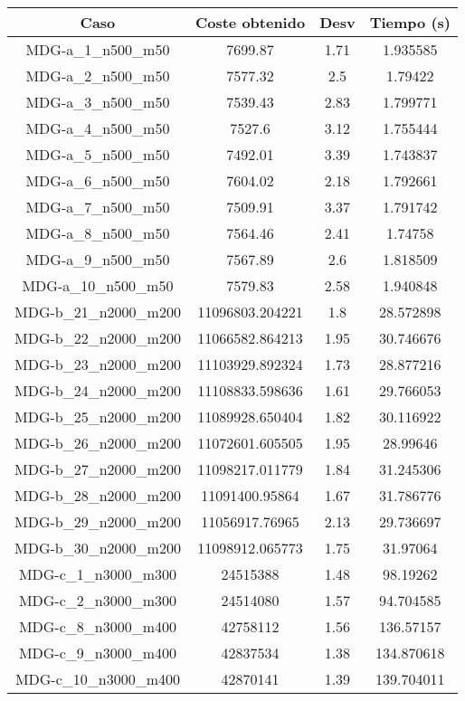 \documentclass{article}
\begin{document}
\begin{table}[H]
	\centering
	\begin{tabular}{|cccc|}
		\hline
		Caso & Coste obtenido & Desv & Tiempo (s)\\ \hline
		MDG-a\_1\_n500\_m50 & 7699.87 & 1.71 & 1.935585\\
		MDG-a\_2\_n500\_m50 & 7577.32 & 2.5 & 1.79422\\
		MDG-a\_3\_n500\_m50 & 7539.43 & 2.83 & 1.799771\\
		MDG-a\_4\_n500\_m50 & 7527.6 & 3.12 & 1.755444\\
		MDG-a\_5\_n500\_m50 & 7492.01 & 3.39 & 1.743837\\
		MDG-a\_6\_n500\_m50 & 7604.02 & 2.18 & 1.792661\\
		MDG-a\_7\_n500\_m50 & 7509.91 & 3.37 & 1.791742\\
		MDG-a\_8\_n500\_m50 & 7564.46 & 2.41 & 1.74758\\
		MDG-a\_9\_n500\_m50 & 7567.89 & 2.6 & 1.818509\\
		MDG-a\_10\_n500\_m50 & 7579.83 & 2.58 & 1.940848\\
		MDG-b\_21\_n2000\_m200 & 11096803.204221 & 1.8 & 28.572898\\
		MDG-b\_22\_n2000\_m200 & 11066582.864213 & 1.95 & 30.746676\\
		MDG-b\_23\_n2000\_m200 & 11103929.892324 & 1.73 & 28.877216\\
		MDG-b\_24\_n2000\_m200 & 11108833.598636 & 1.61 & 29.766053\\
		MDG-b\_25\_n2000\_m200 & 11089928.650404 & 1.82 & 30.116922\\
		MDG-b\_26\_n2000\_m200 & 11072601.605505 & 1.95 & 28.99646\\
		MDG-b\_27\_n2000\_m200 & 11098217.011779 & 1.84 & 31.245306\\
		MDG-b\_28\_n2000\_m200 & 11091400.95864 & 1.67 & 31.786776\\
		MDG-b\_29\_n2000\_m200 & 11056917.76965 & 2.13 & 29.736697\\
		MDG-b\_30\_n2000\_m200 & 11098912.065773 & 1.75 & 31.97064\\
		MDG-c\_1\_n3000\_m300 & 24515388 & 1.48 & 98.19262\\
		MDG-c\_2\_n3000\_m300 & 24514080 & 1.57 & 94.704585\\
		MDG-c\_8\_n3000\_m400 & 42758112 & 1.56 & 136.57157\\
		MDG-c\_9\_n3000\_m400 & 42837534 & 1.38 & 134.870618\\
		MDG-c\_10\_n3000\_m400 & 42870141 & 1.39 & 139.704011\\

\end{tabular}
\end{table}
\end{document}
